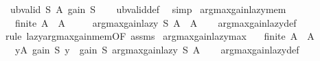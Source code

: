 \begin{isabellebody}
\ \ {\isachardoublequoteopen}ub{\isacharunderscore}{\kern0pt}valid\ S\ A\ {\isacharparenleft}{\kern0pt}gain\ S{\isacharparenright}{\kern0pt}{\isachardoublequoteclose}\isanewline
%
\isadelimproof
\ \ %
\endisadelimproof
%
\isatagproof
{}\isamarkupfalse%
\ ub{\isacharunderscore}{\kern0pt}valid{\isacharunderscore}{\kern0pt}def\ \isamarkupfalse%
\ simp%
\endisatagproof
{\isafoldproof}%
%
\isadelimproof
\isanewline
%
\endisadelimproof
\isanewline
{}\isamarkupfalse%
\ argmax{\isacharunderscore}{\kern0pt}gain{\isacharunderscore}{\kern0pt}lazy{\isacharunderscore}{\kern0pt}mem{\isacharcolon}{\kern0pt}\isanewline
\ \ \ {\isachardoublequoteopen}finite\ A{\isachardoublequoteclose}\ \ {\isachardoublequoteopen}A\ {\isasymnoteq}\ {\isacharbraceleft}{\kern0pt}{\isacharbraceright}{\kern0pt}{\isachardoublequoteclose}\isanewline
\ \ \ {\isachardoublequoteopen}argmax{\isacharunderscore}{\kern0pt}gain{\isacharunderscore}{\kern0pt}lazy\ S\ A\ {\isasymin}\ A{\isachardoublequoteclose}\isanewline
%
\isadelimproof
\ \ %
\endisadelimproof
%
\isatagproof
{}\isamarkupfalse%
\ argmax{\isacharunderscore}{\kern0pt}gain{\isacharunderscore}{\kern0pt}lazy{\isacharunderscore}{\kern0pt}def\isanewline
\ \ \isamarkupfalse%
\ {\isacharparenleft}{\kern0pt}rule\ lazy{\isacharunderscore}{\kern0pt}argmax{\isacharunderscore}{\kern0pt}gain{\isacharunderscore}{\kern0pt}mem{\isacharbrackleft}{\kern0pt}OF\ assms{\isacharbrackright}{\kern0pt}{\isacharparenright}{\kern0pt}%
\endisatagproof
{\isafoldproof}%
%
\isadelimproof
\isanewline
%
\endisadelimproof
\isanewline
{}\isamarkupfalse%
\ argmax{\isacharunderscore}{\kern0pt}gain{\isacharunderscore}{\kern0pt}lazy{\isacharunderscore}{\kern0pt}max{\isacharcolon}{\kern0pt}\isanewline
\ \ \ {\isachardoublequoteopen}finite\ A{\isachardoublequoteclose}\ \ {\isachardoublequoteopen}A\ {\isasymnoteq}\ {\isacharbraceleft}{\kern0pt}{\isacharbraceright}{\kern0pt}{\isachardoublequoteclose}\isanewline
\ \ \ {\isachardoublequoteopen}{\isasymforall}y{\isasymin}A{\isachardot}{\kern0pt}\ gain\ S\ y\ {\isasymle}\ gain\ S\ {\isacharparenleft}{\kern0pt}argmax{\isacharunderscore}{\kern0pt}gain{\isacharunderscore}{\kern0pt}lazy\ S\ A{\isacharparenright}{\kern0pt}{\isachardoublequoteclose}\isanewline
%
\isadelimproof
\ \ %
\endisadelimproof
%
\isatagproof
{}\isamarkupfalse%
\ argmax{\isacharunderscore}{\kern0pt}gain{\isacharunderscore}{\kern0pt}lazy{\isacharunderscore}{\kern0pt}def\isanewline

\end{isabellebody}
